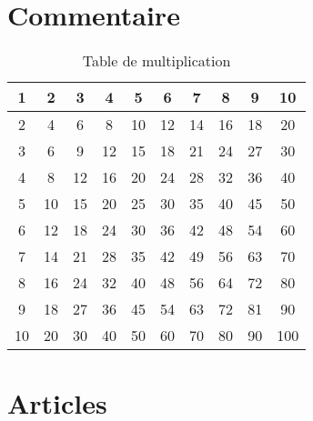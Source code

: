 \section{Commentaire}
\lipsum[1]
\begin{table}[h!tbp]
\begin{center}
\begin{tabular}{|*{10}{c|}}
    \hline
     1  & 2  & 3  & 4  & 5  & 6  & 7  & 8  & 9  & 10 \\
    \hline
     2  & 4  & 6  & 8  & 10 & 12 & 14 & 16 & 18 & 20 \\
    \hline
     3  & 6  & 9  & 12 & 15 & 18 & 21 & 24 & 27 & 30 \\
    \hline
     4  & 8  & 12 & 16 & 20 & 24 & 28 & 32 & 36 & 40 \\
    \hline
     5  & 10 & 15 & 20 & 25 & 30 & 35 & 40 & 45 & 50 \\
    \hline
     6  & 12 & 18 & 24 & 30 & 36 & 42 & 48 & 54 & 60 \\
    \hline
     7  & 14 & 21 & 28 & 35 & 42 & 49 & 56 & 63 & 70 \\
    \hline
     8  & 16 & 24 & 32 & 40 & 48 & 56 & 64 & 72 & 80 \\
    \hline
     9  & 18 & 27 & 36 & 45 & 54 & 63 & 72 & 81 & 90 \\
    \hline
     10  & 20  & 30  & 40  & 50  & 60  & 70  & 80  & 90  & 100 \\
    \hline
\end{tabular}
\end{center}
\caption{Table de multiplication}
\label{table:multi}
\end{table}
\lipsum[2]
\newpage
\section{Articles}

